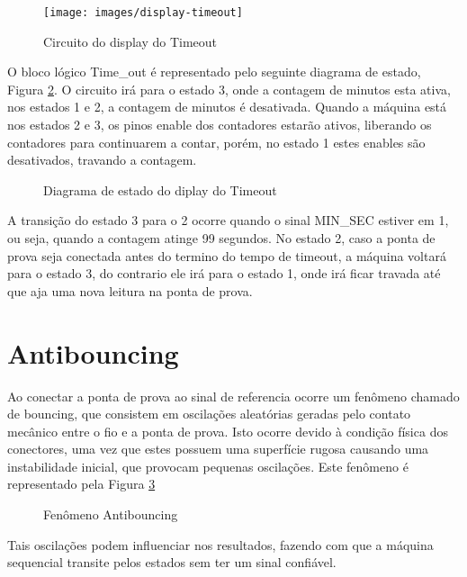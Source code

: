 \begin{figure}[!htp]
	\centering
	\caption{Circuito do display do Timeout}
	\texttt{[image: images/display-timeout]}	\label{fig:display-timeout}
\end{figure}

O bloco lógico Time\_out é representado pelo seguinte diagrama de estado, Figura \ref{fig:diagrama-de-estado-display-timeout}. O circuito irá para o estado 3, onde a contagem de minutos esta ativa, nos estados 1 e 2, a contagem de minutos é desativada. Quando a máquina está nos estados 2 e 3, os pinos enable dos contadores estarão ativos, liberando os contadores para continuarem a contar, porém, no estado 1 estes enables são desativados, travando a contagem.

\begin{figure}[!htp]
	\centering
	\caption{Diagrama de estado do diplay do Timeout}
	\label{fig:diagrama-de-estado-display-timeout}
\end{figure}

A transição do estado 3 para o 2 ocorre quando o sinal MIN\_SEC estiver em 1, ou seja, quando a contagem atinge 99 segundos. No estado 2, caso a ponta de prova seja conectada antes do termino do tempo de timeout, a máquina voltará para o estado 3, do contrario ele irá para o estado 1, onde irá ficar travada até que aja uma nova leitura na ponta de prova.

\section{Antibouncing}

Ao conectar a ponta de prova ao sinal de referencia ocorre um fenômeno chamado de bouncing, que consistem em oscilações aleatórias geradas pelo contato mecânico entre o fio e a ponta de prova. Isto ocorre devido à condição física dos conectores, uma vez que estes possuem uma superfície rugosa causando uma instabilidade inicial, que provocam pequenas oscilações. Este fenômeno é representado pela Figura \ref{fig:bounceTimingDiagram}

\begin{figure}[!htp]
	\centering
	\caption{Fenômeno Antibouncing}
	\label{fig:bounceTimingDiagram}
\end{figure}

Tais oscilações podem influenciar nos resultados, fazendo com que a máquina sequencial transite pelos estados sem ter um sinal confiável.


